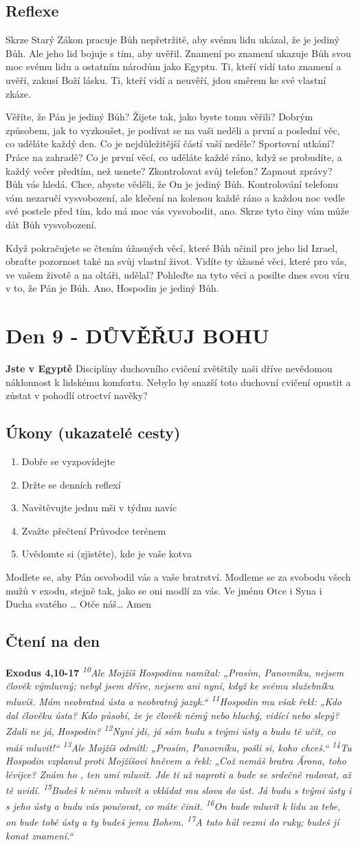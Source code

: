 \documentclass[11pt]{article}
\newcommand{\zacatekDruhyTyden}{
  \textbf{Jste v Egyptě} \newline
  Disciplíny duchovního cvičení zvětštily naši dříve nevědomou náklonnost k lidskému komfortu.
  Nebylo by snazší toto duchovní cvičení opustit a zůstat v pohodlí otroctví navěky?

  \subsection*{Úkony (ukazatelé cesty)}
\begin{enumerate}
  \item Dobře se vyzpovídejte
  \item Držte se denních reflexí
  \item Navštěvujte jednu mši v týdnu navíc
  \item Zvažte přečtení Průvodce terénem
  \item Uvědomte si (zjistěte), kde je vaše kotva
\end{enumerate}
Modlete se, aby Pán osvobodil vás a vaše bratrství. \newline
Modleme se za svobodu všech mužů v exodu, stejně tak, jako se oni modlí za vás.\newline
Ve jménu Otce i Syna i Ducha svatého …  Otče náš… Amen
}
\begin{document}
\subsection*{Reflexe}
Skrze Starý Zákon pracuje Bůh nepřetržitě, aby svému lidu ukázal, že je jediný Bůh. Ale jeho lid bojuje
s tím, aby uvěřil. Znamení po znamení ukazuje Bůh svou moc svému lidu a ostatním národům jako Egyptu.
Ti, kteří vidí tato znamení a uvěří, zakusí Boží lásku. Ti, kteří vidí a neuvěří, jdou směrem ke své vlastní
zkáze.

Věříte, že Pán je jediný Bůh? Žijete tak, jako byste tomu věřili? Dobrým způsobem, jak to vyzkoušet, je
podívat se na vaši neděli a první a poslední věc, co uděláte každý den. Co je nejdůležitější částí vaší neděle?
Sportovní utkání? Práce na zahradě? Co je první věcí, co uděláte každé ráno, když se probudíte, a každý
večer předtím, než usnete? Zkontrolovat svůj telefon? Zapnout zprávy? Bůh vás hledá. Chce, abyste věděli,
že On je jediný Bůh. Kontrolování telefonu vám nezaručí vysvobození, ale klečení na kolenou každé ráno
a každou noc vedle své postele před tím, kdo má moc vás vysvobodit, ano. Skrze tyto činy vám může dát
Bůh vysvobození.

Když pokračujete se čtením úžasných věcí, které Bůh učinil pro jeho lid Izrael, obraťte pozornost také na
svůj vlastní život. Vidíte ty úžasné věci, které pro vás, ve vašem životě a na oltáři, udělal? Pohleďte na tyto
věci a posilte dnes svou víru v to, že Pán je Bůh. Ano, Hospodin je jediný Bůh.


\newpage
\section{Den 9 - DŮVĚŘUJ BOHU}
\zacatekDruhyTyden
\subsection*{Čtení na den}
\textbf{Exodus 4,10-17}
\newline
\textit{
\textsuperscript{10}Ale Mojžíš Hospodinu namítal: „Prosím, Panovníku, nejsem člověk výmluvný; nebyl jsem dříve, nejsem ani nyní, když ke svému služebníku mluvíš. Mám neobratná ústa a neobratný jazyk.“
\textsuperscript{11}Hospodin mu však řekl: „Kdo dal člověku ústa? Kdo působí, že je člověk němý nebo hluchý, vidící nebo slepý? Zdali ne já, Hospodin?
\textsuperscript{12}Nyní jdi, já sám budu s tvými ústy a budu tě učit, co máš mluvit!“
\textsuperscript{13}Ale Mojžíš odmítl: „Prosím, Panovníku, pošli si, koho chceš.“
\textsuperscript{14}Tu Hospodin vzplanul proti Mojžíšovi hněvem a řekl: „Což nemáš bratra Árona, toho lévijce? Znám ho , ten umí mluvit. Jde ti už naproti a bude se srdečně radovat, až tě uvidí.
\textsuperscript{15}Budeš k němu mluvit a vkládat mu slova do úst. Já budu s tvými ústy i s jeho ústy a budu vás poučovat, co máte činit.
\textsuperscript{16}On bude mluvit k lidu za tebe, on bude tobě ústy a ty budeš jemu Bohem.
\textsuperscript{17}A tuto hůl vezmi do ruky; budeš jí konat znamení.“
}
\end{document}
